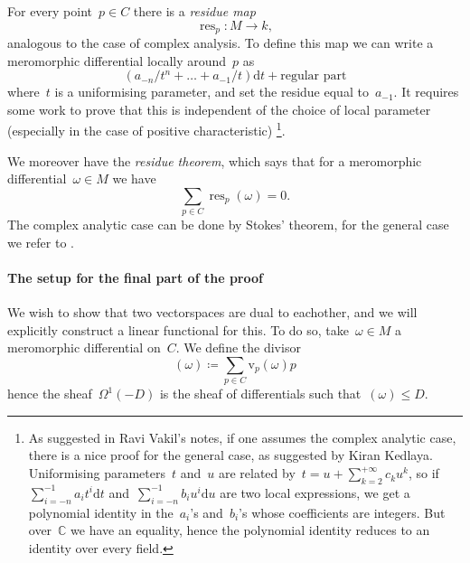 \documentclass[10pt,a4paper]{article}
\theoremstyle{lecture}
\newcommand\dd{\mathrm{d}}
\DeclareMathOperator\res{res}
\begin{document}
For every point~$p\in C$ there is a \emph{residue map}
\begin{equation}
  \res_p\colon M\to k,
\end{equation}
analogous to the case of complex analysis. To define this map we can write a meromorphic differential locally around~$p$ as
\begin{equation}
  (a_{-n}/t^n+\dotso+a_{-1}/t)\dd t+\text{regular part}
\end{equation}
where~$t$ is a uniformising parameter, and set the residue equal to~$a_{-1}$. It requires some work to prove that this is independent of the choice of local parameter (especially in the case of positive characteristic) \cite{serre-groupes-algebriques-et-corps-de-classes}\footnote{As suggested in Ravi Vakil's notes, if one assumes the complex analytic case, there is a nice proof for the general case, as suggested by Kiran Kedlaya. Uniformising parameters~$t$ and~$u$ are related by~$t=u+\sum_{k=2}^{+\infty}c_ku^k$, so if~$\sum_{i=-n}^{-1}a_it^i\dd t$ and~$\sum_{i=-n}^{-1}b_iu^i\dd u$ are two local expressions, we get a polynomial identity in the~$a_i$'s and~$b_i$'s whose coefficients are integers. But over~$\mathbb{C}$ we have an equality, hence the polynomial identity reduces to an identity over every field.}.

We moreover have the \emph{residue theorem}, which says that for a meromorphic differential~$\omega\in M$ we have
\begin{equation}
  \sum_{p\in C}\res_p(\omega)=0.
\end{equation}
The complex analytic case can be done by Stokes' theorem, for the general case we refer to \cite{serre-groupes-algebriques-et-corps-de-classes}.

\paragraph{The setup for the final part of the proof}
We wish to show that two vectorspaces are dual to eachother, and we will explicitly construct a linear functional for this. To do so, take~$\omega\in M$ a meromorphic differential on~$C$. We define the divisor
\begin{equation}
  (\omega)\coloneqq\sum_{p\in C}\mathrm{v}_p(\omega)p
\end{equation}
hence the sheaf~$\Omega^1(-D)$ is the sheaf of differentials such that~$(\omega)\leq D$.
\end{document}
